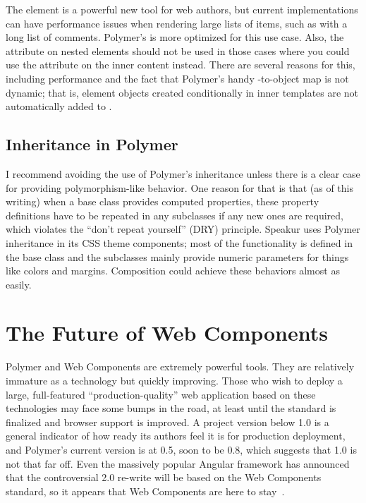 The  element is a powerful new tool for web authors, 
but current implementations can have performance issues when rendering large lists of items, such as with a long list of comments. 
Polymer's  is more optimized for this use case.
Also, the  attribute on nested  elements should not be used in those cases where you could use the  attribute on the inner content instead.
There are several reasons for this, including performance and 
the fact that Polymer's handy  -to-object map is not dynamic; 
that is, element objects created conditionally in inner templates are not automatically added to .

\subsection{Inheritance in Polymer}
I recommend avoiding the use of Polymer's inheritance unless there is a clear case for providing polymorphism-like behavior.
One reason for that is that (as of this writing) when a base class provides computed properties, 
these property definitions have to be repeated in any subclasses if any new ones are required,
which violates the ``don't repeat yourself'' (DRY) principle.
Speakur uses Polymer inheritance in its CSS theme components; 
most of the functionality is defined in the base class and the subclasses mainly provide numeric parameters for things like colors and margins.
Composition could achieve these behaviors almost as easily.


\section{The Future of Web Components}

Polymer and Web Components are extremely powerful tools.
They are relatively immature as a technology but quickly improving.
Those who wish to deploy a large, full-featured ``prod\-uction-quality'' web application based on these technologies may face some bumps in the road, 
at least until the standard is finalized and browser support is improved.
A project version below 1.0 is a general indicator of how ready its authors feel it is for production deployment, and Polymer's current version is at 0.5, soon to be 0.8, 
which suggests that 1.0 is not that far off.
Even the massively popular Angular framework has announced that the controversial 2.0 re-write will be based on the Web Components standard,
so it appears that Web Components are here to stay~\cite{santiagoesteva2015}.

